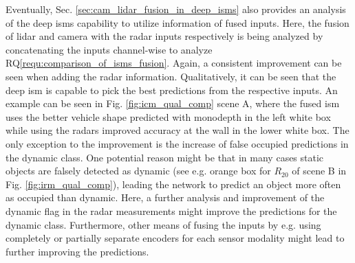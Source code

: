 Eventually, Sec. \ref{sec:cam_lidar_fusion_in_deep_isms} also provides an analysis of the deep \gls{ism}s capability to utilize information of fused inputs. Here, the fusion of lidar and camera with the radar inputs respectively is being analyzed by concatenating the inputs channel-wise to analyze RQ\ref{requ:comparison_of_isms_fusion}. Again, a consistent improvement can be seen when adding the radar information. Qualitatively, it can be seen that the deep \gls{ism} is capable to pick the best predictions from the respective inputs. An example can be seen in Fig. \ref{fig:icm_qual_comp} scene A, where the fused \gls{ism} uses the better vehicle shape predicted with \gls{monodepth} in the left white box while using the radars improved accuracy at the wall in the lower white box. The only exception to the improvement is the increase of false occupied predictions in the dynamic class. One potential reason might be that in many cases static objects are falsely detected as dynamic (see e.g. orange box for $R_{20}$ of scene B in Fig. \ref{fig:irm_qual_comp}), leading the network to predict an object more often as occupied than dynamic. Here, a further analysis and improvement of the dynamic flag in the radar measurements might improve the predictions for the dynamic class. Furthermore, other means of fusing the inputs by e.g. using completely or partially separate encoders for each sensor modality might lead to further improving the predictions.
%
